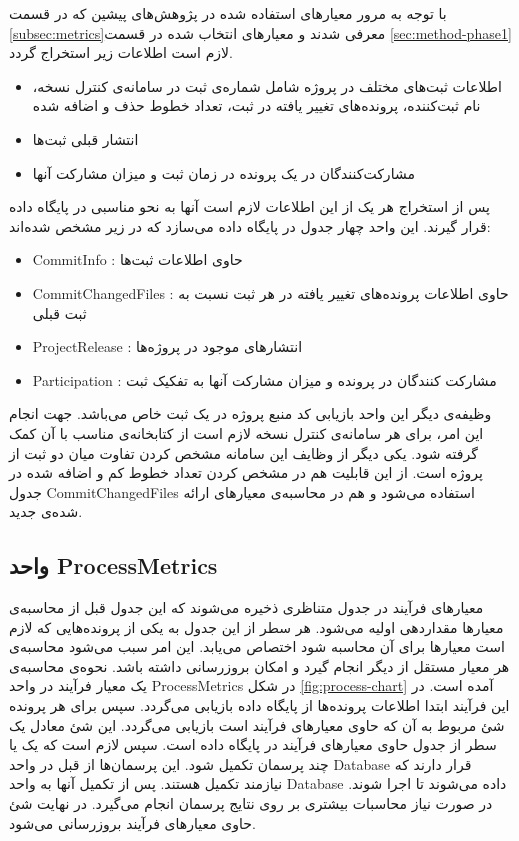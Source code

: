 با توجه به مرور معیارهای استفاده شده در پژوهش‌های پیشین که در قسمت \ref{subsec:metrics}‌معرفی شدند و معیارهای انتخاب شده در قسمت \ref{sec:method-phase1}  لازم است اطلاعات زیر استخراج گردد.
\begin{itemize}
\item
اطلاعات ثبت‌های مختلف در پروژه شامل شماره‌ی ثبت در سامانه‌ی کنترل نسخه، نام ثبت‌کننده، پرونده‌های تغییر یافته در ثبت، تعداد خطوط حذف و اضافه شده
\item
انتشار قبلی ثبت‌ها
\item
مشارکت‌کنندگان در یک پرونده در زمان ثبت و میزان مشارکت آنها

\end{itemize}

پس از استخراج هر یک از این اطلاعات لازم است آنها به نحو مناسبی در پایگاه داده قرار گیرند. این واحد چهار جدول در پایگاه داده می‌سازد که در زیر مشخص شده‌اند:
\begin{itemize}
\item CommitInfo :
حاوی اطلاعات ثبت‌ها
\item CommitChangedFiles : 
حاوی اطلاعات پرونده‌های تغییر یافته در هر ثبت نسبت به ثبت قبلی
\item ProjectRelease :
انتشارهای موجود در پروژه‌ها
\item Participation :
مشارکت کنندگان در پرونده و میزان مشارکت آنها به تفکیک ثبت
\end{itemize}

وظیفه‌ی دیگر این واحد بازیابی کد منبع  پروژه در یک ثبت خاص  می‌باشد.  جهت انجام این امر،  برای هر سامانه‌ی کنترل نسخه لازم است از کتابخانه‌ی مناسب با آن کمک گرفته شود. یکی دیگر از وظایف این سامانه مشخص کردن تفاوت میان دو ثبت از پروژه است. از این قابلیت هم در مشخص کردن تعداد خطوط کم و اضافه شده در جدول CommitChangedFiles استفاده می‌شود و هم در محاسبه‌ی معیارهای ارائه شده‌ی جدید. 

\subsection{واحد ProcessMetrics}
معیارهای فرآیند در جدول متناظری ذخیره می‌شوند که  این جدول قبل از محاسبه‌ی معیارها مقداردهی اولیه می‌شود. هر سطر از این جدول به یکی از پرونده‌هایی که لازم است معیارها برای آن محاسبه شود اختصاص می‌یابد. این امر سبب می‌شود محاسبه‌ی هر معیار مستقل از دیگر انجام گیرد و امکان بروزرسانی داشته باشد. نحوه‌ی محاسبه‌ی یک معیار فرآیند در واحد ProcessMetrics در شکل \ref{fig:process-chart}  آمده است. در این فرآیند ابتدا اطلاعات پرونده‌ها از پایگاه داده بازیابی می‌گردد. سپس برای هر پرونده شئ مربوط به آن که حاوی معیارهای فرآیند است بازیابی می‌گردد. این شئ معادل یک سطر از جدول حاوی معیارهای فرآیند در پایگاه داده است. سپس لازم است که یک یا چند پرسمان تکمیل شود. این پرسمان‌ها از قبل در واحد Database  قرار دارند که نیازمند تکمیل هستند. پس از تکمیل آنها به واحد Database داده می‌شوند تا اجرا شوند. در صورت نیاز محاسبات بیشتری بر روی نتایج پرسمان انجام می‌گیرد. در نهایت شئ حاوی معیارهای فرآیند بروزرسانی می‌شود. 

